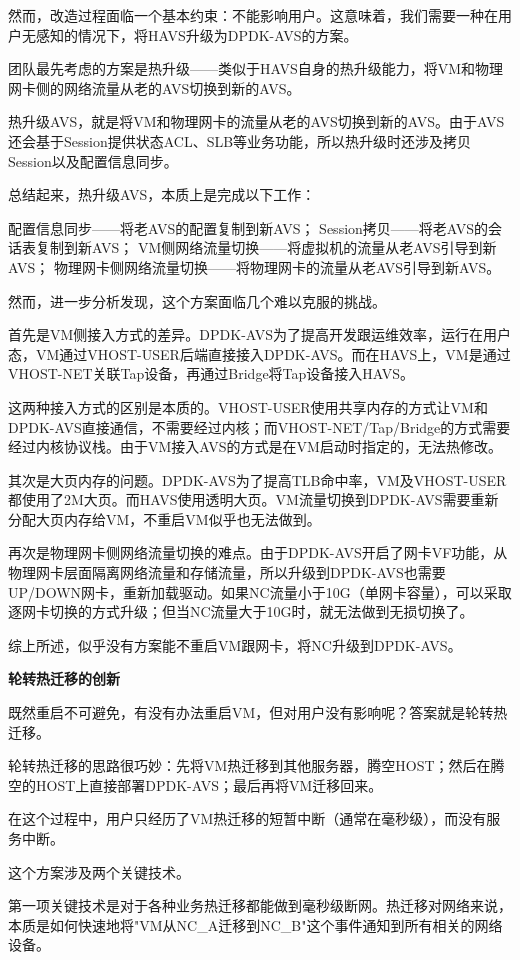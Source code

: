 然而，改造过程面临一个基本约束：不能影响用户。这意味着，我们需要一种在用户无感知的情况下，将HAVS升级为DPDK-AVS的方案。

团队最先考虑的方案是热升级——类似于HAVS自身的热升级能力，将VM和物理网卡侧的网络流量从老的AVS切换到新的AVS。

热升级AVS，就是将VM和物理网卡的流量从老的AVS切换到新的AVS。由于AVS还会基于Session提供状态ACL、SLB等业务功能，所以热升级时还涉及拷贝Session以及配置信息同步。

总结起来，热升级AVS，本质上是完成以下工作：

配置信息同步——将老AVS的配置复制到新AVS；
Session拷贝——将老AVS的会话表复制到新AVS；
VM侧网络流量切换——将虚拟机的流量从老AVS引导到新AVS；
物理网卡侧网络流量切换——将物理网卡的流量从老AVS引导到新AVS。

然而，进一步分析发现，这个方案面临几个难以克服的挑战。

首先是VM侧接入方式的差异。DPDK-AVS为了提高开发跟运维效率，运行在用户态，VM通过VHOST-USER后端直接接入DPDK-AVS。而在HAVS上，VM是通过VHOST-NET关联Tap设备，再通过Bridge将Tap设备接入HAVS。

这两种接入方式的区别是本质的。VHOST-USER使用共享内存的方式让VM和DPDK-AVS直接通信，不需要经过内核；而VHOST-NET/Tap/Bridge的方式需要经过内核协议栈。由于VM接入AVS的方式是在VM启动时指定的，无法热修改。

其次是大页内存的问题。DPDK-AVS为了提高TLB命中率，VM及VHOST-USER都使用了2M大页。而HAVS使用透明大页。VM流量切换到DPDK-AVS需要重新分配大页内存给VM，不重启VM似乎也无法做到。

再次是物理网卡侧网络流量切换的难点。由于DPDK-AVS开启了网卡VF功能，从物理网卡层面隔离网络流量和存储流量，所以升级到DPDK-AVS也需要UP/DOWN网卡，重新加载驱动。如果NC流量小于10G（单网卡容量），可以采取逐网卡切换的方式升级；但当NC流量大于10G时，就无法做到无损切换了。

综上所述，似乎没有方案能不重启VM跟网卡，将NC升级到DPDK-AVS。

\textbf{轮转热迁移的创新}

既然重启不可避免，有没有办法重启VM，但对用户没有影响呢？答案就是轮转热迁移。

轮转热迁移的思路很巧妙：先将VM热迁移到其他服务器，腾空HOST；然后在腾空的HOST上直接部署DPDK-AVS；最后再将VM迁移回来。

在这个过程中，用户只经历了VM热迁移的短暂中断（通常在毫秒级），而没有服务中断。

这个方案涉及两个关键技术。

第一项关键技术是对于各种业务热迁移都能做到毫秒级断网。热迁移对网络来说，本质是如何快速地将"VM从NC_A迁移到NC_B"这个事件通知到所有相关的网络设备。

